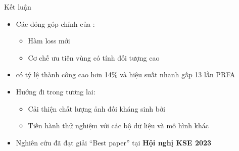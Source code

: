 \documentclass[aspectratio=169, 12pt]{beamer}
\begin{document}
\begin{frame}{Kết luận}

\begin{itemize}
\item Các đóng góp chính của \proposedMethod:
\begin{itemize}
    \item Hàm loss mới
    \item Cơ chế ưu tiên vùng có tính đối tượng cao
\end{itemize}

\item \proposedMethod có tỷ lệ thành công cao hơn 14\% và hiệu suất nhanh gấp 13 lần PRFA

\item Hướng đi trong tương lai:
\begin{itemize}
    \item Cải thiện chất lượng ảnh đối kháng sinh bởi \proposedMethod
    \item Tiến hành thử nghiệm với các bộ dữ liệu và mô hình khác
\end{itemize}

\item Nghiên cứu đã đạt giải “Best paper” tại \textbf{Hội nghị KSE 2023}

\end{itemize}
\end{frame}



      
 
	
	
	
\end{document}
